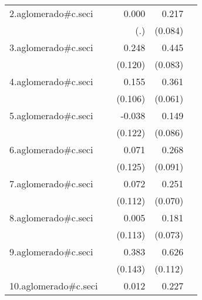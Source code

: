 {\begin{longtable}{l*{4}{D{.}{.}{-1}}}
\addlinespace
2.aglomerado#c.seci&                     &       0.000         &       0.217\sym{*}  &                     \\
            &                     &         (.)         &     (0.084)         &                     \\
\addlinespace
3.aglomerado#c.seci&                     &       0.248\sym{*}  &       0.445\sym{***}&                     \\
            &                     &     (0.120)         &     (0.083)         &                     \\
\addlinespace
4.aglomerado#c.seci&                     &       0.155         &       0.361\sym{***}&                     \\
            &                     &     (0.106)         &     (0.061)         &                     \\
\addlinespace
5.aglomerado#c.seci&                     &      -0.038         &       0.149         &                     \\
            &                     &     (0.122)         &     (0.086)         &                     \\
\addlinespace
6.aglomerado#c.seci&                     &       0.071         &       0.268\sym{**} &                     \\
            &                     &     (0.125)         &     (0.091)         &                     \\
\addlinespace
7.aglomerado#c.seci&                     &       0.072         &       0.251\sym{***}&                     \\
            &                     &     (0.112)         &     (0.070)         &                     \\
\addlinespace
8.aglomerado#c.seci&                     &       0.005         &       0.181\sym{*}  &                     \\
            &                     &     (0.113)         &     (0.073)         &                     \\
\addlinespace
9.aglomerado#c.seci&                     &       0.383\sym{**} &       0.626\sym{***}&                     \\
            &                     &     (0.143)         &     (0.112)         &                     \\
\addlinespace
10.aglomerado#c.seci&                     &       0.012         &       0.227\sym{***}&                     \\

\end{longtable}}
